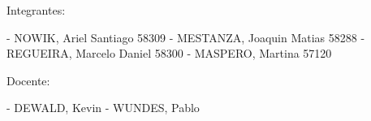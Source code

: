 Integrantes:

 - NOWIK, Ariel Santiago 58309
 - MESTANZA, Joaquin Matias 58288
 - REGUEIRA, Marcelo Daniel 58300
 - MASPERO, Martina 57120

 Docente:

  - DEWALD, Kevin
  - WUNDES, Pablo
